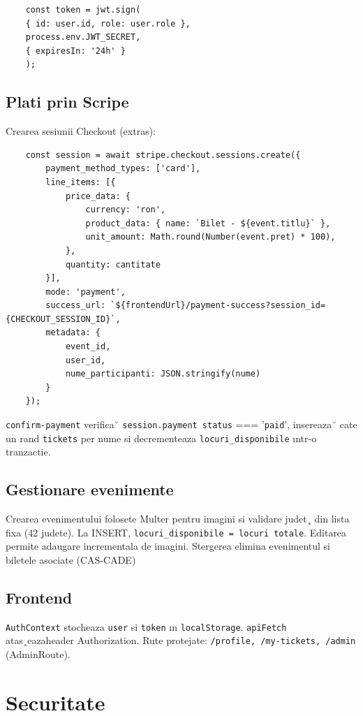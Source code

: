\begin{lstlisting}
	const token = jwt.sign(
	{ id: user.id, role: user.role },
	process.env.JWT_SECRET,
	{ expiresIn: '24h' }
	);
\end{lstlisting}

\subsection{Plati prin Scripe}

Crearea sesiunii Checkout (extras):

\begin{lstlisting}
	const session = await stripe.checkout.sessions.create({
		payment_method_types: ['card'],
		line_items: [{ 
			price_data: {
				currency: 'ron',
				product_data: { name: `Bilet - ${event.titlu}` },
				unit_amount: Math.round(Number(event.pret) * 100),
			}, 
			quantity: cantitate 
		}],
		mode: 'payment',
		success_url: `${frontendUrl}/payment-success?session_id={CHECKOUT_SESSION_ID}`,
		metadata: { 
			event_id, 
			user_id, 
			nume_participanti: JSON.stringify(nume)
		}
	});
\end{lstlisting}

{\tt confirm-payment} verifica˘ {\tt session.payment status} === ’{\tt paid}’, insereaza˘
cate un rand {\tt tickets} per nume si decrementeaza {\tt locuri\_disponibile} ıntr-o tranzactie.

\subsection{Gestionare evenimente}

Crearea evenimentului folosete Multer pentru imagini si validare judet¸ din lista fixa (42 judete). La INSERT, {\tt locuri\_disponibile = locuri totale}. Editarea permite adaugare incrementala de imagini. Stergerea elimina evenimentul si biletele asociate (CAS-CADE)

\subsection{Frontend}
	
{\tt AuthContext} stocheaza {\tt user} si {\tt token} ın {\tt localStorage}. {\tt apiFetch} atas¸eazaheader Authorization. Rute protejate: {\tt /profile, /my-tickets, /admin} (AdminRoute).



\section{Securitate}

